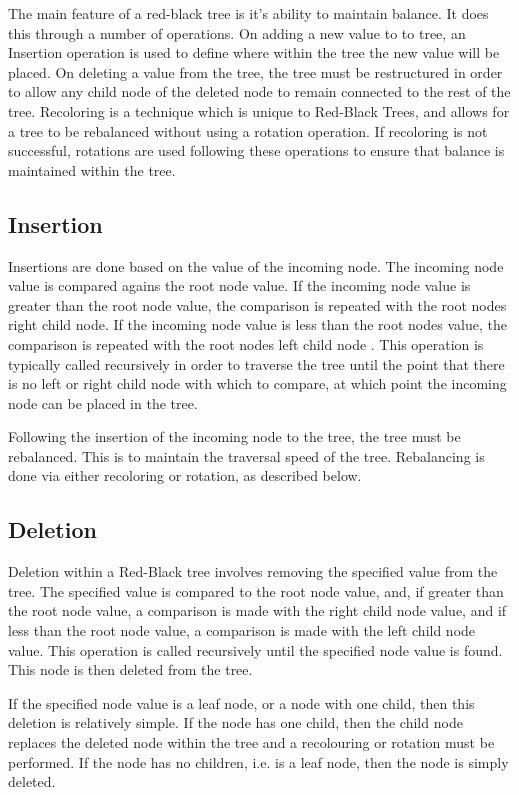 The main feature of a red-black tree is it's ability to maintain balance. It
does this through a number of operations. On adding a new value to to tree, an
Insertion operation is used to define where within the tree the new value will
be placed. On deleting a value from the tree, the tree must be restructured in
order to allow any child node of the deleted node to remain connected to the
rest of the tree. Recoloring is a technique which is unique to Red-Black Trees,
and allows for a tree to be rebalanced without using a rotation operation. If
recoloring is not successful, rotations are used following these operations to
ensure that balance is maintained within the tree.

\subsection{Insertion}

Insertions are done based on the value of the incoming node. The incoming node
value is compared agains the root node value. If the incoming node value is
greater than the root node value, the comparison is repeated with the root nodes
right child node. If the incoming node value is less than the root nodes value,
the comparison is repeated with the root nodes left child node\cite{geeksInsert}
. This operation
is typically called recursively in order to traverse the tree until the point
that there is no left or right child node with which to compare, at which point
the incoming node can be placed in the tree.

Following the insertion of the incoming node to the tree, the tree must be
rebalanced. This is to maintain the traversal speed of the tree. Rebalancing is
done via either recoloring or rotation, as described below.

\subsection{Deletion}

Deletion within a Red-Black tree involves removing the specified value from the
tree. The specified value is compared to the root node value, and, if greater
than the root node value, a comparison is made with the right child node value,
and if less than the root node value, a comparison is made with the left child
node value. This operation is called recursively until the specified node value
is found. This node is then deleted from the tree.

If the specified node value is a leaf node, or a node with one child, then this
deletion is relatively simple. If the node has one child, then the child node
replaces the deleted node within the tree and a recolouring or rotation must be
performed. If the node has no children, i.e. is a leaf node, then the node is
simply deleted\cite{geeksDelete}.

